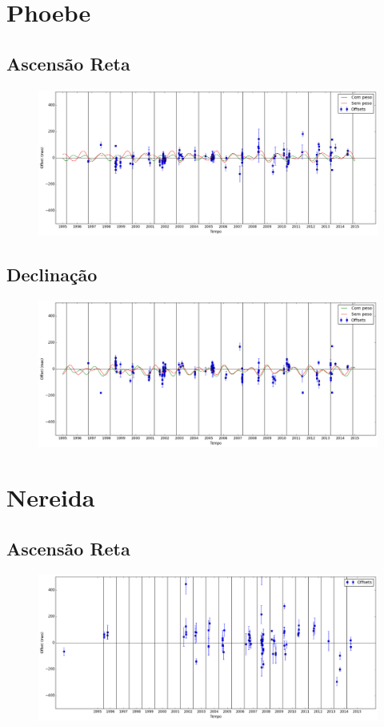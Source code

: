 \documentclass[11pt,a4paper]{report}
\begin{document}
\chapter*{Phoebe}
\section*{Ascensão Reta}

\begin{figure}[h]
\includegraphics[scale=0.35]{Phoebe/RA.png} 
\end{figure}

\section*{Declinação}

\begin{figure}[h]
\includegraphics[scale=0.35]{Phoebe/DEC.png} 
\end{figure}

\chapter*{Nereida}
\section*{Ascensão Reta}

\begin{figure}[h]
\includegraphics[scale=0.35]{Nereida/RA.png} 
\end{figure}
\end{document}
